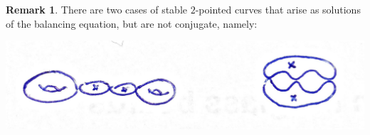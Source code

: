 \documentclass[11pt]{amsart}
\renewcommand{\k}{\mathbf k}
\newcommand{\OO}{\mathcal O}
\renewcommand{\to}{\rightarrow}
\newcommand{\dvr}{\Delta}
\newcommand{\Pic}{\operatorname{Pic}}
\theoremstyle{plain}
\newtheorem{lem}[thm]{Lemma}
\theoremstyle{definition}
\newtheorem{rem}[thm]{Remark}
\begin{document}
\begin{rem}\label{rmk:extra_conjugate}
There are two cases of stable $2$-pointed curves that arise as solutions of the balancing equation, but are not conjugate, namely:
  \begin{center}
 \includegraphics[width=.8\textwidth]{extra_conjugate}  
  \end{center}
\end{rem}

\end{document}
